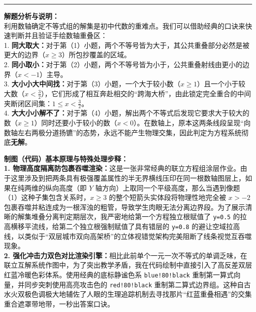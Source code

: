 \documentclass[12pt, a4paper]{ctexrep}
\begin{document}
\vspace{0.6cm}
\hrule
\vspace{0.4cm}

{\small\color{gray}
\textbf{解题分析与说明：}\\
利用数轴确定不等式组的解集是初中代数的重难点。我们可以借助经典的口诀来快速判断并且验证手绘数轴重叠区：\\
1. \textbf{同大取大：}对于第（1）小题，两个不等号皆为大于，其公共重叠部分必然是被更大的边界（$x \geqslant 3$）所包抄覆盖的区域。\\
2. \textbf{同小取小：}对于第（2）小题，两个不等号皆为小于，公共重叠射线由更小的边界（$x < -1$）主导。\\
3. \textbf{大小小大中间找：}对于第（3）小题，一个大于较小数（$x \geqslant 1$）且一个小于较大数（$x < \frac{3}{2}$），它们形成了相互奔赴相交的“跨海大桥”，由此锁定完全重合的中间夹断闭区间集：$1 \leqslant x < \frac{3}{2}$。\\
4. \textbf{大大小小解不了：}对于第（4）小题，解出两个不等式后发现它要求大于较大的数（$x \geqslant 1$）同时还要小于较小的数（$x < 0$）。在数轴上，原本这两条线段呈现“向数轴左右两极分道扬镳”的态势，永远不能产生物理交集，因此判定为方程系统彻底\textbf{无解}。
}

\vspace{0.6cm}

{\small\color{blue!70!black}
\textbf{制图（代码）基本原理与特殊处理步释：}\\
\textbf{1. 物理高度隔离防包裹吞噬渲染：}这是一张非常经典的联立方程组涂层作业。由于这里涉及到把两条具有极强覆盖属性的半无界横线压印在同一根数轴图层上，如果在纯两维的纵向高度（即 $Y$ 轴方向）上取同一个平级高度，那么当遇到像题（1）这种子集包含关系时，$x \geqslant 3$ 的整个短箭头实体段将物理性地完全被 $x > -2$ 包裹吞噬并粘连成为一根浑浊的粗管，导致学生肉眼无法分离边界段。为了展示清晰的解集堆叠分离判定期层次，我严密地给第一个方程独立根赋值了 \texttt{y=0.5} 的拉高横移平流线，给第二个独立根强制赋值了具有错层的 \texttt{y=0.8} 的避让空域拉高线，以类似于“双层城市双向高架桥”的立体视错觉架构完美阻断了线条视觉互吞噬现象。\\
\textbf{2. 强化冲击力双色对比渲染引擎：}相比此前单个一元一次不等式的单调乏味，在联立互解系统作图中，为了突出教学矛盾，我在代码绘制中直接引入了高反差双层红蓝冷暖色彩体系。使用经典的底标静谧色系 \texttt{blue!80!black} 重制第一算式向量，并同步突刺使用高亮攻击色的 \texttt{red!80!black} 重制第二算式边界组。这种自古水火双极色调极大地辅佐了人眼的生理追踪机制去寻找那片“红蓝重叠相遇”的交集重合遮罩带地带，一秒出答案口诀。
}

\newpage
\end{document}
